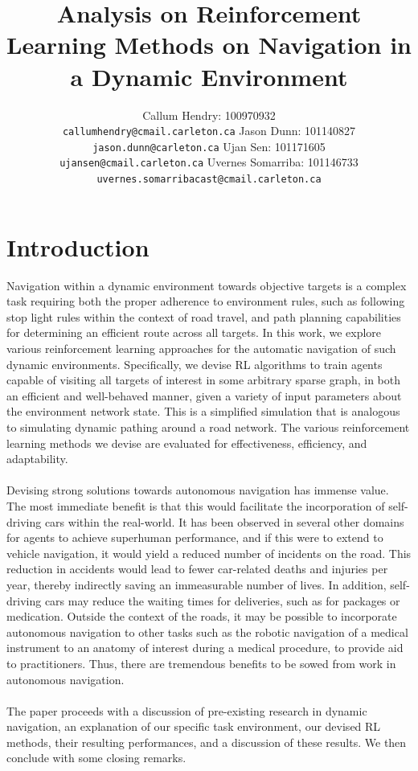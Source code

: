 \documentclass{article}
\title{Analysis on Reinforcement Learning Methods on Navigation in a Dynamic Environment}
\author{
	Callum Hendry: 100970932\\
	\texttt{callumhendry@cmail.carleton.ca}
	\And
	Jason Dunn: 101140827\\
	\texttt{jason.dunn@carleton.ca}
	\And
	Ujan Sen: 101171605\\
	\texttt{ujansen@cmail.carleton.ca}
	\And
	Uvernes Somarriba: 101146733\\
	\texttt{uvernes.somarribacast@cmail.carleton.ca}
}
\begin{document}
	
	
	\maketitle
	
	\section{Introduction}
        Navigation within a dynamic environment towards objective targets is a complex task requiring both the proper adherence to environment rules, such as following stop light rules within the context of road travel, and path planning capabilities for determining an efficient route across all targets. In this work, we explore various reinforcement learning approaches for the automatic navigation of such dynamic environments. Specifically, we devise RL algorithms to train agents capable of visiting all targets of interest in some arbitrary sparse graph, in both an efficient and well-behaved manner, given a variety of input parameters about the environment network state. This is a simplified simulation that is analogous to simulating dynamic pathing around a road network. The various reinforcement learning methods we devise are evaluated for effectiveness, efficiency, and adaptability.
        \\ \\
        Devising strong solutions towards autonomous navigation has immense value. The most immediate benefit is that this would facilitate the incorporation of self-driving cars within the real-world. It has been observed in several other domains for agents to achieve superhuman performance, and if this were to extend to vehicle navigation, it would yield a reduced number of incidents on the road. This reduction in accidents would lead to fewer car-related deaths and injuries per year, thereby indirectly saving an immeasurable number of lives. In addition, self-driving cars may reduce the waiting times for deliveries, such as for packages or medication. Outside the context of the roads, it may be possible to incorporate autonomous navigation to other tasks such as the robotic navigation of a medical instrument to an anatomy of interest during a medical procedure, to provide aid to practitioners. Thus, there are tremendous benefits to be sowed from work in autonomous navigation. 
        \\ \\
        The paper proceeds with a discussion of pre-existing research in dynamic navigation, an explanation of our specific task environment, our devised RL methods, their resulting performances, and a discussion of these results. We then conclude with some closing remarks.
      
\end{document}
